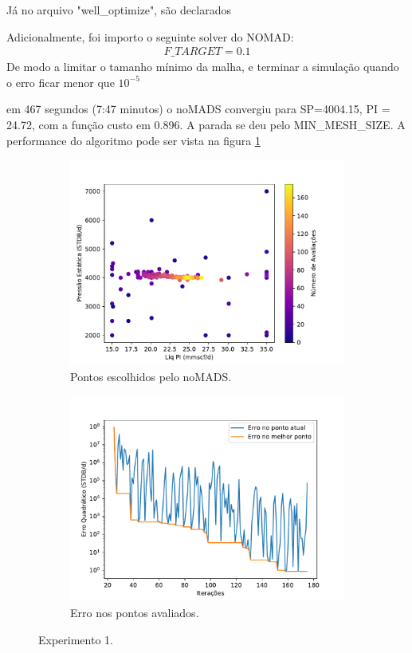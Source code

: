 Já no arquivo "well\_optimize", são declarados

Adicionalmente, foi importo o seguinte solver do NOMAD:
\begin{align}
F\_TARGET = 0.1
\end{align}
De modo a limitar o tamanho mínimo da malha, e terminar a simulação quando o erro ficar menor que $10^{-5}$

em 467 segundos (7:47 minutos) o noMADS convergiu para SP=4004.15, PI = 24.72, com a função custo em 0.896. A parada se deu pelo MIN\_MESH\_SIZE. A performance do algoritmo pode ser vista na figura \ref{fig:setup1_points}


\begin{figure}
\centering
\begin{subfigure}{0.5\textwidth}
  \centering
  \includegraphics[width=1\linewidth]{figs/setup1_eval_points.pdf}
  \caption{Pontos escolhidos pelo noMADS.}
  \label{fig:setup1_points}
\end{subfigure}%
\begin{subfigure}{0.5\textwidth}
  \centering
  \includegraphics[width=1\linewidth]{figs/setup1_errors.pdf}
  \caption{Erro nos pontos avaliados.}
  \label{fig:setup1_error}
\end{subfigure}
\caption{Experimento 1.}
\label{fig:setup1_2}
\end{figure}

